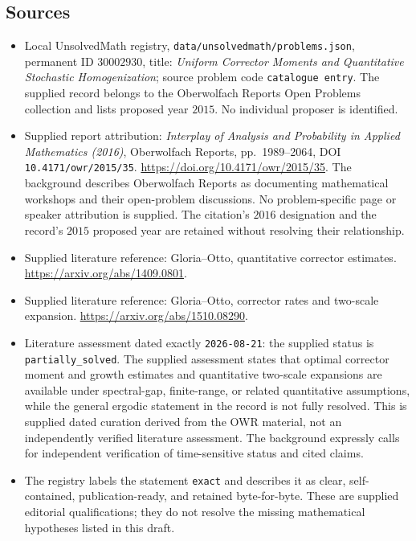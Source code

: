 \documentclass[11pt]{article}
\begin{document}
\subsection{Sources}
\begin{itemize}
\item Local UnsolvedMath registry, \texttt{data/unsolvedmath/problems.json}, permanent ID \(30002930\), title: \emph{Uniform Corrector Moments and Quantitative Stochastic Homogenization}; source problem code \texttt{catalogue entry}. The supplied record belongs to the Oberwolfach Reports Open Problems collection and lists proposed year \(2015\). No individual proposer is identified.
\item Supplied report attribution: \emph{Interplay of Analysis and Probability in Applied Mathematics (2016)}, Oberwolfach Reports, pp.\ 1989--2064, DOI \texttt{10.4171/owr/2015/35}. \url{https://doi.org/10.4171/owr/2015/35}. The background describes Oberwolfach Reports as documenting mathematical workshops and their open-problem discussions. No problem-specific page or speaker attribution is supplied. The citation's \(2016\) designation and the record's \(2015\) proposed year are retained without resolving their relationship.
\item Supplied literature reference: Gloria--Otto, quantitative corrector estimates. \url{https://arxiv.org/abs/1409.0801}.
\item Supplied literature reference: Gloria--Otto, corrector rates and two-scale expansion. \url{https://arxiv.org/abs/1510.08290}.
\item Literature assessment dated exactly \texttt{2026-08-21}: the supplied status is \texttt{partially\_solved}. The supplied assessment states that optimal corrector moment and growth estimates and quantitative two-scale expansions are available under spectral-gap, finite-range, or related quantitative assumptions, while the general ergodic statement in the record is not fully resolved. This is supplied dated curation derived from the OWR material, not an independently verified literature assessment. The background expressly calls for independent verification of time-sensitive status and cited claims.
\item The registry labels the statement \texttt{exact} and describes it as clear, self-contained, publication-ready, and retained byte-for-byte. These are supplied editorial qualifications; they do not resolve the missing mathematical hypotheses listed in this draft.
\end{itemize}
\end{document}
